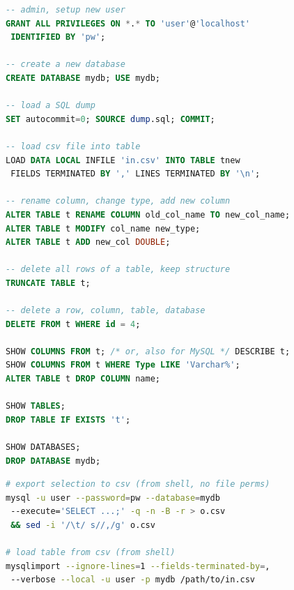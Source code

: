 \begin{lstlisting}[language=SQL]
-- admin, setup new user
GRANT ALL PRIVILEGES ON *.* TO 'user'@'localhost'
 IDENTIFIED BY 'pw';

-- create a new database
CREATE DATABASE mydb; USE mydb;

-- load a SQL dump
SET autocommit=0; SOURCE dump.sql; COMMIT;

-- load csv file into table
LOAD DATA LOCAL INFILE 'in.csv' INTO TABLE tnew
 FIELDS TERMINATED BY ',' LINES TERMINATED BY '\n';

-- rename column, change type, add new column
ALTER TABLE t RENAME COLUMN old_col_name TO new_col_name;
ALTER TABLE t MODIFY col_name new_type;
ALTER TABLE t ADD new_col DOUBLE;

-- delete all rows of a table, keep structure
TRUNCATE TABLE t;

-- delete a row, column, table, database
DELETE FROM t WHERE id = 4;

SHOW COLUMNS FROM t; /* or, also for MySQL */ DESCRIBE t;
SHOW COLUMNS FROM t WHERE Type LIKE 'Varchar%';
ALTER TABLE t DROP COLUMN name;

SHOW TABLES;
DROP TABLE IF EXISTS 't';

SHOW DATABASES;
DROP DATABASE mydb;
\end{lstlisting}

\begin{lstlisting}[language=bash]
# export selection to csv (from shell, no file perms)
mysql -u user --password=pw --database=mydb
 --execute='SELECT ...;' -q -n -B -r > o.csv
 && sed -i '/\t/ s//,/g' o.csv

# load table from csv (from shell)
mysqlimport --ignore-lines=1 --fields-terminated-by=,
 --verbose --local -u user -p mydb /path/to/in.csv
\end{lstlisting}
